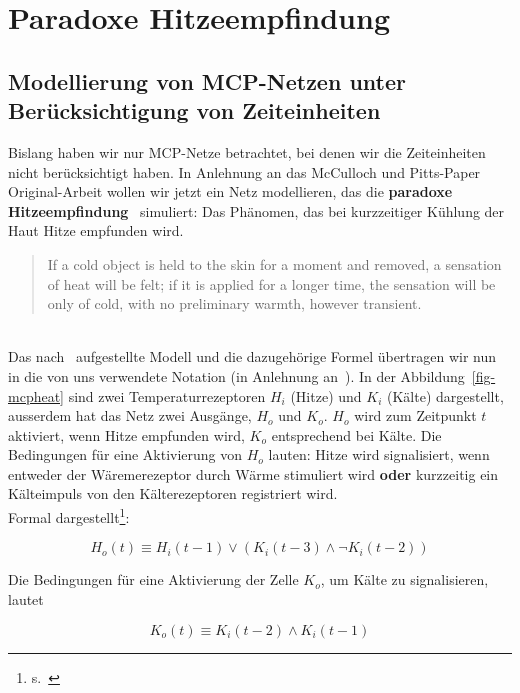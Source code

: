 \chapter{Paradoxe Hitzeempfindung}\label{appendix:paradoxehitzeempfindung}
\section*{Modellierung von MCP-Netzen unter Berücksichtigung von Zeiteinheiten}

Bislang haben wir nur MCP-Netze betrachtet, bei denen wir die Zeiteinheiten nicht berücksichtigt haben. In Anlehnung an das McCulloch und Pitts-Paper Original-Arbeit wollen wir jetzt ein Netz modellieren, das die \textbf{paradoxe Hitzeempfindung}~\cite{HVKJ82} simuliert: Das Phänomen, das bei kurzzeitiger Kühlung der Haut Hitze empfunden wird.\\

\blockquote[{\cite[106]{MP43}}]{
    If a cold object is held to the skin for a moment and removed, a sensation of heat will be felt; if it is applied for a longer time, the sensation will be only of cold, with no preliminary warmth, however transient.
}\\

Das nach~\cite[105, Figure 1 (e)]{MP43} aufgestellte Modell und die dazugehörige Formel übertragen wir nun in die von uns verwendete Notation (in Anlehnung an~\cite[31 f.]{Fau94}). In der Abbildung~\ref{fig-mcpheat} sind zwei Temperaturrezeptoren $H_i$ (Hitze) und $K_i$ (Kälte) dargestellt, ausserdem hat das Netz zwei Ausgänge, $H_o$ und $K_o$. $H_o$ wird zum Zeitpunkt $t$ aktiviert, wenn Hitze empfunden wird, $K_o$ entsprechend bei Kälte.
\noindent
Die Bedingungen für eine Aktivierung von $H_o$ lauten: Hitze wird signalisiert, wenn entweder der Wäremerezeptor durch Wärme stimuliert wird \textbf{oder} kurzzeitig ein Kälteimpuls von den Kälterezeptoren registriert wird.\\

Formal dargestellt\footnote{
    s.~\cite[106]{MP43}
}:

\begin{equation}
    H_o(t) \equiv H_i(t-1) \lor (K_i(t-3) \land \neg K_i(t - 2))
    \label{eq:gl-heat}
\end{equation}

Die Bedingungen für eine Aktivierung der Zelle $K_o$, um Kälte zu signalisieren, lautet


\begin{equation}
    K_o(t) \equiv K_i(t-2) \land K_i(t-1)
    \label{eq:gl-cold}
\end{equation}


